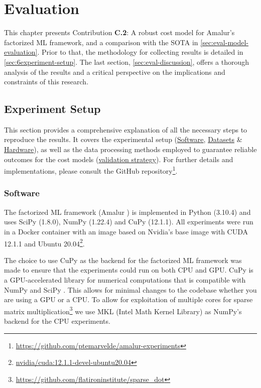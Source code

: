 
\chapter{Evaluation}
\label{chapter:evaluation-discussion}
This chapter presents Contribution \textbf{C.2}: A robust cost model for Amalur's factorized ML framework, and a comparison with the SOTA in \autoref{sec:eval-model-evaluation}. Prior to that, the methodology for collecting results is detailed in \autoref{sec:6experiment-setup}. The last section, \autoref{sec:eval-discussion}, offers a thorough analysis of the results and a critical perspective on the implications and constraints of this research.

\section{Experiment Setup}
\label{sec:6experiment-setup}
This section provides a comprehensive explanation of all the necessary steps to reproduce the results. It covers the experimental setup (\hyperref[subsec:6-software]{Software}, \hyperref[subsec:6-datasets]{Datasets} \& \hyperref[subsec:6-hardware]{Hardware}), as well as the data processing methods employed to guarantee reliable outcomes for the cost models (\hyperref[subsec:6-validation-strategy]{validation strategy}). For further details and implementations, please consult the GitHub repository\footnote{\url{https://github.com/ptemarvelde/amalur-experiments}}.

\subsection{Software}
\label{subsec:6-software}
The factorized ML framework (Amalur \cite{amalur}) is implemented in Python (3.10.4) and uses SciPy (1.8.0), NumPy (1.22.4) and CuPy (12.1.1). All experiments were run in a Docker container with an image based on Nvidia's base image with CUDA 12.1.1 and Ubuntu 20.04\footnote{\href{https://hub.docker.com/layers/nvidia/cuda/12.1.1-devel-ubuntu20.04/images/sha256-5bd13c67a4479a1c13238b470d89a92937ce68ba5f21b930d50c463e3314f657?context=explore}{nvidia/cuda:12.1.1-devel-ubuntu20.04}}.

The choice to use CuPy as the backend for the factorized ML framework was made to ensure that the experiments could run on both CPU and GPU. CuPy is a GPU-accelerated library for numerical computations that is compatible with NumPy and SciPy \cite{cupy_learningsys2017}. This allows for minimal changes to the codebase whether you are using a GPU or a CPU. To allow for exploitation of multiple cores for sparse matrix multiplication\footnote{\url{https://github.com/flatironinstitute/sparse_dot}} we use MKL (Intel Math Kernel Library) \cite{intel-mkl} as NumPy's backend for the CPU experiments.

